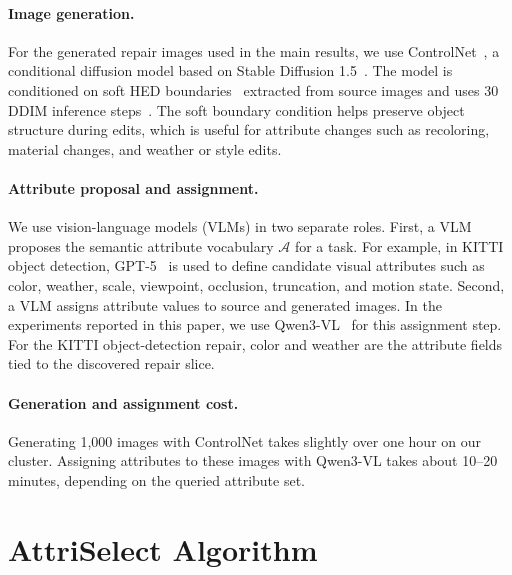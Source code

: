 \documentclass{article}
\newcommand{\model}{AttriSelect\xspace}
\newcommand{\controlnet}{ControlNet\xspace}
\newcommand{\attrs}{\mathcal{A}}
\begin{document}
\paragraph{Image generation.}
For the generated repair images used in the main results, we use \controlnet~\citep{zhang2023adding}, a conditional diffusion model based on Stable Diffusion 1.5~\citep{rombach2022high}. The model is conditioned on soft HED boundaries~\citep{xie2015holistically} extracted from source images and uses 30 DDIM inference steps~\citep{ddim}. The soft boundary condition helps preserve object structure during edits, which is useful for attribute changes such as recoloring, material changes, and weather or style edits.

\paragraph{Attribute proposal and assignment.}
We use vision-language models (VLMs) in two separate roles. First, a VLM proposes the semantic attribute vocabulary $\attrs$ for a task. For example, in KITTI object detection, GPT-5~\citep{openai2025gpt5} is used to define candidate visual attributes such as color, weather, scale, viewpoint, occlusion, truncation, and motion state. Second, a VLM assigns attribute values to source and generated images. In the experiments reported in this paper, we use Qwen3-VL~\citep{bai2025qwen3vl} for this assignment step. For the KITTI object-detection repair, color and weather are the attribute fields tied to the discovered repair slice.

\paragraph{Generation and assignment cost.}
Generating 1,000 images with ControlNet takes slightly over one hour on our cluster. Assigning attributes to these images with Qwen3-VL takes about 10--20 minutes, depending on the queried attribute set.

\section{\model Algorithm}
\label{app:attriselect-algorithm}
\end{document}
